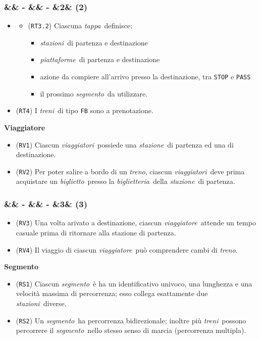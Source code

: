 \documentclass[slidestop,compress,blackandwhite]{beamer}
\newcommand{\ttt}[1]{\texttt{#1}}
\newcommand{\ii}[1]{\textit{#1}}
\newcommand{\treno}{\ii{treno}}
\newcommand{\treni}{\ii{treni}}
\newcommand{\viaggiatore}{\ii{viaggiatore}}
\newcommand{\viaggiatori}{\ii{viaggiatori}}
\newcommand{\stazione}{\ii{stazione}}
\newcommand{\stazioni}{\ii{stazioni}}
\newcommand{\piattaforme}{\ii{piattaforme}}
\newcommand{\ticket}{\ii{biglietto}}
\newcommand{\segmento}{\ii{segmento}}
\newcommand{\stage}{\ii{tappa}}
\newcommand{\biglietteria}{\ii{biglietteria}}
\newcommand{\newtitle}[4]{
	#1 
	\ifx&#2&%
	\else
  		\large- #2
	\fi
	\ifx&#3&%
	\else
  		\normalsize- #3
	\fi
	\ifx&#4&%
	\else
  		\normalsize (#4)
	\fi
}
\newcommand{\newframe}[5]{
	\begin{frame}
		\frametitle{\newtitle{#1}{#2}{#3}{#4}}
		#5
	\end{frame}
}
\newcommand{\itemt}[1]{\item (\ttt{#1})}
\begin{document}
	
	\newframe{}{}{}{2}{
	
		\begin{itemize}
			\item[]
			\begin{itemize} 
				\itemt{RT3.2} Ciascuna \stage~definisce:
				\begin{itemize}
					\item \stazioni~di partenza e destinazione
					\item \piattaforme~di partenza e destinazione
					\item azione da compiere all'arrivo presso la destinazione, tra \ttt{STOP} e \ttt{PASS}
					\item il prossimo \segmento~da utilizzare.
				\end{itemize}
			\end{itemize}
			\itemt{RT4} I \treni~di tipo \ttt{FB} sono a prenotazione.
		\end{itemize}
		\vspace{0.5cm}
		\textbf{Viaggiatore}
		\begin{itemize}
			\itemt{RV1} Ciascun \viaggiatori~possiede una \stazione~di partenza ed una di destinazione.
			\itemt{RV2} Per poter salire a bordo di un \treno, ciascun \viaggiatori~deve prima acquistare un \ticket~presso la \biglietteria~della \stazione~di partenza.
		\end{itemize}
	}

	\newframe{}{}{}{3}{
		\begin{itemize}
			\itemt{RV3} Una volta arivato a destinazione, ciascun \viaggiatore~attende un tempo casuale prima di ritornare alla stazione di partenza.
			\itemt{RV4} Il viaggio di ciascun \viaggiatore~può comprendere cambi di \treno.
		\end{itemize}
		\vspace{0.5cm}
		\textbf{Segmento}
		\begin{itemize}
			\itemt{RS1} Ciascun \segmento~è ha un identificativo univoco, una lunghezza e una velocità massima di percorrenza; esso collega esattamente due \stazioni~diverse.
			\itemt{RS2} Un \segmento~ha percorrenza bidirezionale; inoltre più \treni~possono percorrere il \segmento~nello stesso senso di marcia (percorrenza multipla).  
		\end{itemize}
	}
\end{document}
